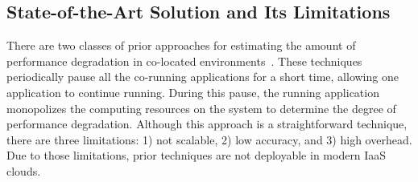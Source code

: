 \documentclass{sig-alternate}
\begin{document}
\subsection{State-of-the-Art Solution and Its Limitations}
\label{subsec:State-of-the-ArtSolutionandItsLimitations}

There are two classes of prior approaches for estimating the amount of performance degradation in co-located environments~\cite{fairpricing, 6844481, bubbleflux, Tang:2013:RRS:2451116.2451126}. These techniques periodically pause all the co-running applications for a short time, allowing one application to continue running. During this pause, the running application monopolizes the computing resources on the system to determine the degree of performance degradation. Although this approach is a straightforward technique, there are three limitations: 1) not scalable, 2) low accuracy, and 3) high overhead. Due to those limitations, prior techniques are not deployable in modern IaaS clouds.
\end{document}
